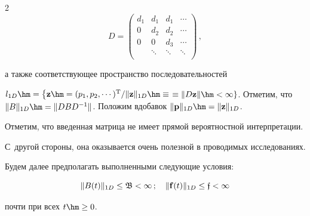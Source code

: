 \begin{multicols}{2}
\begin{equation*}

D=\begin{pmatrix}

d_1   & d_1 & d_1 & \cdots  \\

0   & d_2  & d_2  &   \cdots  \\

0   & 0  & d_3  &   \cdots  \\

& \ddots & \ddots & \ddots \\

\end{pmatrix}\,, 


\end{equation*}

а также соответствующее пространство последовательностей

$l_{1D}\hm=\left\{{\bf z} \hm= (p_1,p_2,\cdots)^{\mathrm{T}} / \|{\bf z}\|_{1D}

\hm\equiv\right.$\linebreak $\left.\equiv \|D {\bf z}\| \hm<\infty \right\}$. Отметим, что  $\|B\|_{1D} \hm=

\|DBD^{-1}\|$. Положим вдобавок $\|{\bf p}\|_{1D}\hm = \|{\bf z}\|_{1D}$.






Отметим, что введенная матрица  не имеет прямой вероятностной интерпретации.

С~другой стороны, она оказывается очень полезной в проводимых исследованиях.










Будем далее предполагать выполненными следующие условия:

\begin{equation*}

\|B(t)\|_{1D} \le  \mathfrak{B}< \infty\,; \quad  \|{\bf f}(t)\|_{1D} \le \mathfrak{f}< \infty


\end{equation*}

\noindent почти при всех $t \hm\ge 0$.




\end{multicols}
